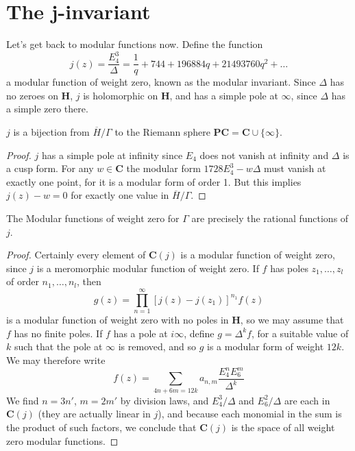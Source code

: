 \section{The j-invariant}

Let's get back to modular functions now. Define the function
%
\[ j(z) = \frac{E_4^3}{\Delta} = \frac{1}{q} + 744 + 196884 q + 21493760 q^2 + \dots \]
%
a modular function of weight zero, known as the modular invariant. Since $\Delta$ has no zeroes on $\mathbf{H}$, $j$ is holomorphic on $\mathbf{H}$, and has a simple pole at $\infty$, since $\Delta$ has a simple zero there.

\begin{theorem}
    $j$ is a bijection from $\overline{H}/\Gamma$ to the Riemann sphere $\mathbf{P} \mathbf{C} = \mathbf{C} \cup \{ \infty \}$.
\end{theorem}
\begin{proof}
    $j$ has a simple pole at infinity since $E_4$ does not vanish at infinity and $\Delta$ is a cusp form. For any $w \in \mathbf{C}$ the modular form $1728 E_4^3 - w \Delta$ must vanish at exactly one point, for it is a modular form of order 1. But this implies $j(z) - w = 0$ for exactly one value in $\overline{H}/\Gamma$.
\end{proof}

\begin{theorem}
    The Modular functions of weight zero for $\Gamma$ are precisely the rational functions of $j$.
\end{theorem}
\begin{proof}
    Certainly every element of $\mathbf{C}(j)$ is a modular function of weight zero, since $j$ is a meromorphic modular function of weight zero. If $f$ has poles $z_1, \dots, z_l$ of order $n_1, \dots, n_l$, then
    \[ g(z) = \prod_{n = 1}^\infty [j(z) - j(z_1)]^{n_1} f(z) \]
    is a modular function of weight zero with no poles in $\mathbf{H}$, so we may assume that $f$ has no finite poles. If $f$ has a pole at $i \infty$, define $g = \Delta^k f$, for a suitable value of $k$ such that the pole at $\infty$ is removed, and so $g$ is a modular form of weight $12k$. We may therefore write
    \[ f(z) = \sum_{4n + 6m = 12k} a_{n,m} \frac{E_4^n E_6^m}{\Delta^k} \]
    We find $n = 3n'$, $m = 2m'$ by division laws, and $E_4^3/\Delta$ and $E_6^2/\Delta$ are each in $\mathbf{C}(j)$ (they are actually linear in $j$), and because each monomial in the sum is the product of such factors, we conclude that $\mathbf{C}(j)$ is the space of all weight zero modular functions.
\end{proof}

